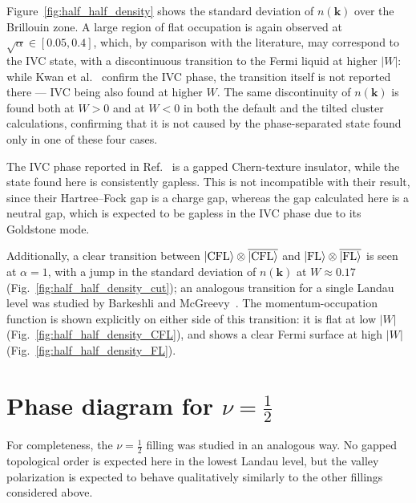 Figure~\ref{fig:half_half_density} shows the standard deviation of $n(\mathbf{k})$ over the Brillouin zone. A large region of flat occupation is again observed at $\sqrt{\alpha} \in [0.05, 0.4]$, which, by comparison with the literature, may correspond to the IVC state, with a discontinuous transition to the Fermi liquid at higher $|W|$: while Kwan et al.~\cite{kwan2025textured} confirm the IVC phase, the transition itself is not reported there --- IVC being also found at higher $W$. The same discontinuity of $n(\mathbf{k})$ is found both at $W > 0$ and at $W < 0$ in both the default and the tilted cluster calculations, confirming that it is not caused by the phase-separated state found only in one of these four cases.

The IVC phase reported in Ref.~\cite{kwan2025textured} is a gapped Chern-texture insulator, while the state found here is consistently gapless. This is not incompatible with their result, since their Hartree--Fock gap is a charge gap, whereas the gap calculated here is a neutral gap, which is expected to be gapless in the IVC phase due to its Goldstone mode.


Additionally, a clear transition between $\ket{\text{CFL}} \otimes \overline{\ket{\text{CFL}}}$ and $\ket{\text{FL}} \otimes \overline{\ket{\text{FL}}}$ is seen at $\alpha=1$, with a jump in the standard deviation of $n(\mathbf{k})$ at $W \approx 0.17$ (Fig.~\ref{fig:half_half_density_cut}); an analogous transition for a single Landau level was studied by Barkeshli and McGreevy~\cite{barkeshli2012continuous}. The momentum-occupation function is shown explicitly on either side of this transition: it is flat at low $|W|$ (Fig.~\ref{fig:half_half_density_CFL}), and shows a clear Fermi surface at high $|W|$ (Fig.~\ref{fig:half_half_density_FL}).

\section{\texorpdfstring{Phase diagram for $\nu = \frac12$}{Phase diagram for nu = 1/2}}

For completeness, the $\nu = \tfrac{1}{2}$ filling was studied in an analogous way. No gapped topological order is expected here in the lowest Landau level, but the valley polarization is expected to behave qualitatively similarly to the other fillings considered above.

